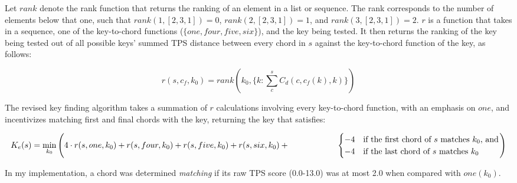 Let $rank$ denote the rank function that returns the ranking of an element in a list or sequence. The rank corresponds to the number of elements below that one, such that $rank(1, [2,3,1]) = 0$, $rank(2, [2,3,1]) = 1$, and $rank(3, [2,3,1]) = 2$. $r$ is a function that takes in a sequence, one of the key-to-chord functions ($\{one, four, five, six\}$), and the key being tested. It then returns the ranking of the key being tested out of all possible keys' summed TPS distance between every chord in $s$ against the key-to-chord function of the key, as follows:

\[ r(s,{c_f},k_0) = rank(k_0, \{k : \sum_c^s C_d(c,{c_f}(k),k)\}) \]

The revised key finding algorithm takes a summation of $r$ calculations involving every key-to-chord function, with an emphasis on $one$, and incentivizes matching first and final chords with the key, returning the key that satisfies:

\[ K_e(s) = \min_{k_0}\left( 4 \cdot r(s,one,k_0) + r(s,four,k_0) + r(s,five,k_0) + r(s,six,k_0) +\\ \hspace{2cm} \begin{cases} -4 &\text{if the first chord of }s\text{ matches }k_0\text{, and} \\ -4 &\text{if the last chord of }s\text{ matches }k_0 \end{cases} \right) \]

In my implementation, a chord was determined \textit{matching} if its raw TPS score (0.0-13.0) was at most 2.0 when compared with $one(k_0)$.
